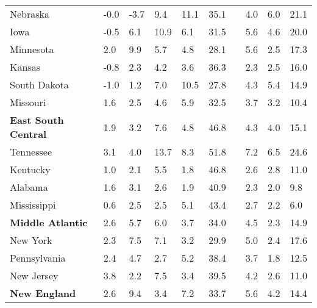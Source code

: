 {\begin{tabular}{p{30mm} R{7mm} R{7mm} R{7mm} R{7mm} 
             R{7mm} p{0mm} R{9mm} R{9mm} R{10mm} }
\hspace{3mm}  Nebraska  & -0.0 & -3.7 & 9.4 & 11.1 & 35.1 &  & 4.0 & 6.0 & 21.1 \\
\hspace{3mm}  Iowa  & -0.5 & 6.1 & 10.9 & 6.1 & 31.5 &  & 5.6 & 4.6 & 20.0 \\
\hspace{3mm}  Minnesota  & 2.0 & 9.9 & 5.7 & 4.8 & 28.1 &  & 5.6 & 2.5 & 17.3 \\
\hspace{3mm}  Kansas  & -0.8 & 2.3 & 4.2 & 3.6 & 36.3 &  & 2.3 & 2.5 & 16.0 \\
\hspace{3mm}  South Dakota  & -1.0 & 1.2 & 7.0 & 10.5 & 27.8 &  & 4.3 & 5.4 & 14.9 \\
\hspace{3mm}  Missouri  & 1.6 & 2.5 & 4.6 & 5.9 & 32.5 &  & 3.7 & 3.2 & 10.4 \\
\hspace{1mm} \textbf{East South Central}  & 1.9 & 3.2 & 7.6 & 4.8 & 46.8 &  & 4.3 & 4.0 & 15.1 \\
\hspace{3mm}  Tennessee  & 3.1 & 4.0 & 13.7 & 8.3 & 51.8 &  & 7.2 & 6.5 & 24.6 \\
\hspace{3mm}  Kentucky  & 1.0 & 2.1 & 5.5 & 1.8 & 46.8 &  & 2.6 & 2.8 & 11.0 \\
\hspace{3mm}  Alabama  & 1.6 & 3.1 & 2.6 & 1.9 & 40.9 &  & 2.3 & 2.0 & 9.8 \\
\hspace{3mm}  Mississippi  & 0.6 & 2.5 & 2.5 & 5.1 & 43.4 &  & 2.7 & 2.2 & 6.0 \\
\hspace{1mm} \textbf{Middle Atlantic}  & 2.6 & 5.7 & 6.0 & 3.7 & 34.0 &  & 4.5 & 2.3 & 14.9 \\
\hspace{3mm}  New York  & 2.3 & 7.5 & 7.1 & 3.2 & 29.9 &  & 5.0 & 2.4 & 17.6 \\
\hspace{3mm}  Pennsylvania  & 2.4 & 4.7 & 2.7 & 5.2 & 38.4 &  & 3.7 & 1.8 & 12.5 \\
\hspace{3mm}  New Jersey  & 3.8 & 2.2 & 7.5 & 3.4 & 39.5 &  & 4.2 & 2.6 & 11.0 \\
\hspace{1mm} \textbf{New England}  & 2.6 & 9.4 & 3.4 & 7.2 & 33.7 &  & 5.6 & 4.2 & 14.4 \\

\end{tabular}}
